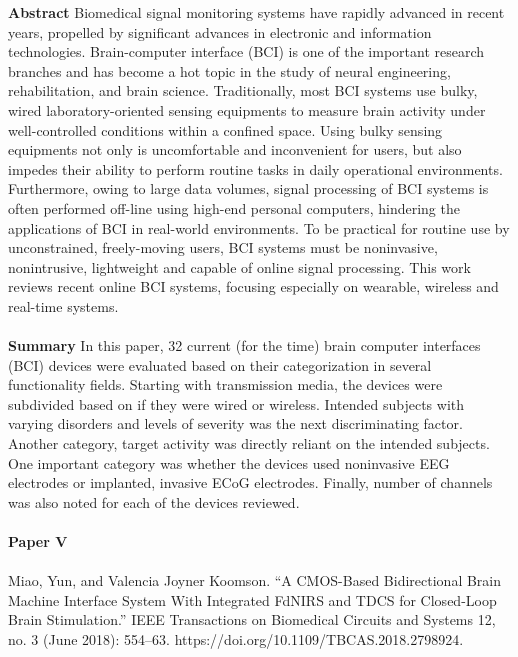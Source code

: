 \noindent
\textbf{Abstract} Biomedical signal monitoring systems have rapidly advanced in recent years, propelled by significant advances in electronic and information technologies. Brain-computer interface (BCI) is one of the important research branches and has become a hot topic in the study of neural engineering, rehabilitation, and brain science. Traditionally, most BCI systems use bulky, wired laboratory-oriented sensing equipments to measure brain activity under well-controlled conditions within a confined space. Using bulky sensing equipments not only is uncomfortable and inconvenient for users, but also impedes their ability to perform routine tasks in daily operational environments. Furthermore, owing to large data volumes, signal processing of BCI systems is often performed off-line using high-end personal computers, hindering the applications of BCI in real-world environments. To be practical for routine use by unconstrained, freely-moving users, BCI systems must be noninvasive, nonintrusive, lightweight and capable of online signal processing. This work reviews recent online BCI systems, focusing especially on wearable, wireless and real-time systems. \\ \\

\noindent
\textbf{Summary} In this paper, 32 current (for the time) brain computer interfaces (BCI) devices were evaluated based on their categorization in several functionality fields. Starting with transmission media, the devices were subdivided based on if they were wired or wireless. Intended subjects with varying disorders and levels of severity was the next discriminating factor. Another category, target activity was directly reliant on the intended subjects. One important category was whether the devices used noninvasive EEG electrodes or implanted, invasive ECoG electrodes. Finally, number of channels was also noted for each of the devices reviewed.  \\ \\


\textbf{Paper V} 
\\ \\
\noindent
Miao, Yun, and Valencia Joyner Koomson. “A CMOS-Based Bidirectional Brain Machine Interface System With Integrated FdNIRS and TDCS for Closed-Loop Brain Stimulation.” IEEE Transactions on Biomedical Circuits and Systems 12, no. 3 (June 2018): 554–63. https://doi.org/10.1109/TBCAS.2018.2798924. \\ \\

